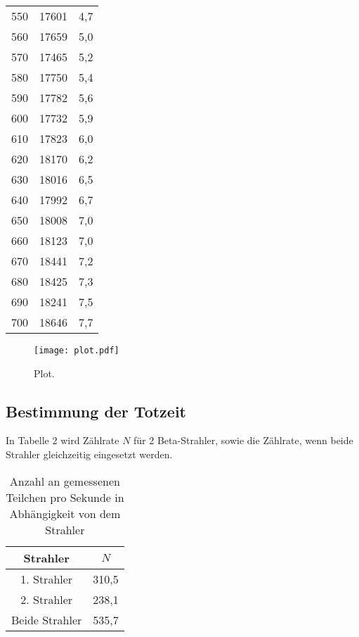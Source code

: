 \begin{table}[H]
\begin{tabular}{c c c}
    550 &	17601 &	4,7 \\
    560 &	17659 &	5,0 \\
    570 &	17465 &	5,2 \\
    580 &	17750 &	5,4 \\
    590 &	17782 &	5,6 \\
    600 &	17732 &	5,9 \\
    610 &	17823 &	6,0 \\
    620 &	18170 &	6,2 \\
    630 &	18016 &	6,5 \\
    640 &	17992 &	6,7 \\
    650 &	18008 &	7,0 \\
    660 &	18123 &	7,0 \\
    670 &	18441 &	7,2 \\
    680 &	18425 &	7,3 \\
    690 &	18241 &	7,5 \\
    700 &	18646 &	7,7 \\
    \bottomrule
  \end{tabular}
\end{table}

\begin{figure}
  \centering
  \texttt{[image: plot.pdf]}
  \caption{Plot.}
  \label{fig:plot}
\end{figure}










\subsection{Bestimmung der Totzeit}

In Tabelle 2 wird Zählrate $N$ für 2 Beta-Strahler, sowie die Zählrate, wenn beide Strahler gleichzeitig
eingesetzt werden.

\begin{table}[H]
  \centering
  \caption{Anzahl an gemessenen Teilchen pro Sekunde in Abhängigkeit von dem Strahler}
  \label{tab:Rechteckspannung}
  \begin{tabular}{c c}
    \toprule
    Strahler & $N$  \\
    \midrule
    1. Strahler & 310,5 \\
    2. Strahler & 238,1\\
    Beide Strahler & 535,7 \\
    \bottomrule
  \end{tabular}
\end{table}

